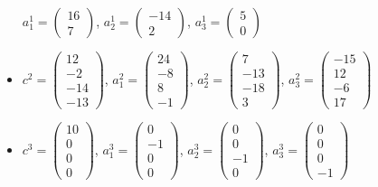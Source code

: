 \begin{example}
\begin{itemize}
    $a^1_1 = \begin{pmatrix} 16 \\ 7 \end{pmatrix}$, 
    $a^1_2 = \begin{pmatrix} -14 \\ 2 \end{pmatrix}$, 
    $a^1_3 = \begin{pmatrix} 5 \\ 0 \end{pmatrix}$
    \item $c^2 = \begin{pmatrix} 12 \\ -2 \\ -14 \\ -13 \end{pmatrix}$, 
    $a^2_1 = \begin{pmatrix} 24 \\ -8 \\ 8 \\ -1 \end{pmatrix}$, %
    $a^2_2 = \begin{pmatrix} 7 \\ -13 \\ -18 \\ 3 \end{pmatrix}$, %
    $a^2_3 = \begin{pmatrix} -15 \\ 12 \\ -6 \\ 17 \end{pmatrix}$ %
    \item $c^3 = \begin{pmatrix} 10 \\ 0 \\ 0 \\ 0 \end{pmatrix}$, 
    $a^3_1 = \begin{pmatrix} 0 \\ -1 \\ 0 \\ 0 \end{pmatrix}$, 
    $a^3_2 = \begin{pmatrix} 0 \\ 0 \\ -1 \\ 0 \end{pmatrix}$, 
    $a^3_3 = \begin{pmatrix} 0 \\ 0 \\ 0 \\ -1 \end{pmatrix}$

\end{itemize}
\end{example}
